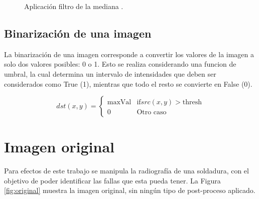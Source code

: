 \documentclass[
  letterpaper,
  twocolumn,
  9pt,
  journal,
  final]{IEEEtran}
\begin{document}
\begin{figure}[!tbh]
  \begin{center}
  \end{center}
  \caption{Aplicación filtro de la mediana \cite{median}.} \label{fig:sample_eq}
\end{figure}

\subsection{Binarización de una imagen}

La binarización de una imagen corresponde a convertir los valores de la imagen a solo dos valores posibles: 0 o 1. Esto se realiza considerando una funcion de umbral, la cual determina un intervalo de intensidades que deben ser considerados como True (1), mientras que todo el resto se convierte en False (0).

\[  dst(x,y) = \begin{cases}
      \text{maxVal} & \text{if} src(x,y) > \text{thresh} \\
      0 & \text{Otro caso}
   \end{cases}
\]

\section{Imagen original}


Para efectos de este trabajo se manipula la radiografía de una soldadura, con el objetivo de poder identificar las fallas que esta pueda tener. La Figura \ref{fig:original} muestra la imagen original, sin ningún tipo de post-proceso aplicado.
\end{document}
